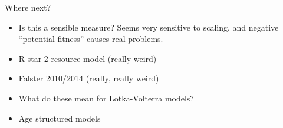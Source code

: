 \documentclass[12pt]{beamer}
\begin{document}
\begin{frame}[t]{Where next?}
  \begin{itemize}
  \item Is this a sensible measure?  Seems very sensitive to scaling,
    and negative ``potential fitness'' causes real problems.
  \item R star 2 resource model (really weird)
  \item Falster 2010/2014 (really, really weird)
  \item What do these mean for Lotka-Volterra models?
  \item Age structured models
  \end{itemize}
\end{frame}
\end{document}
